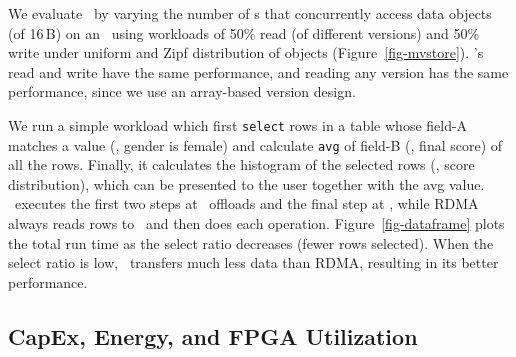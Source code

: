 We evaluate \sysmv\ by varying the number of \CN{}s that concurrently access data objects (of 16\,B) on an \MN\ using workloads of 50\% read (of different versions) and 50\% write under uniform and Zipf distribution of objects (Figure~\ref{fig-mvstore}). 
\sysmv's read and write have the same performance, and reading any version has the 
same performance, since we use an array-based version design. 




We run a simple workload which first \texttt{select} rows in a table whose field-A matches a value (\eg, gender is female)
and calculate \texttt{avg} of field-B (\eg, final score) of all the rows.
Finally, it calculates the histogram of the selected rows (\eg, score distribution), which can be presented to the user together with the avg value. %
\sys\ executes the first two steps at \MN\ offloads and the final step at \CN,
while RDMA always reads rows to \CN\ and then does each operation.
Figure~\ref{fig-dataframe} plots the total run time as the select ratio decreases (fewer rows selected).
When the select ratio is low, \sys\ transfers much less data than RDMA, resulting in its better performance.






\subsection{CapEx, Energy, and FPGA Utilization}
\label{sec:clio:results-cost}


